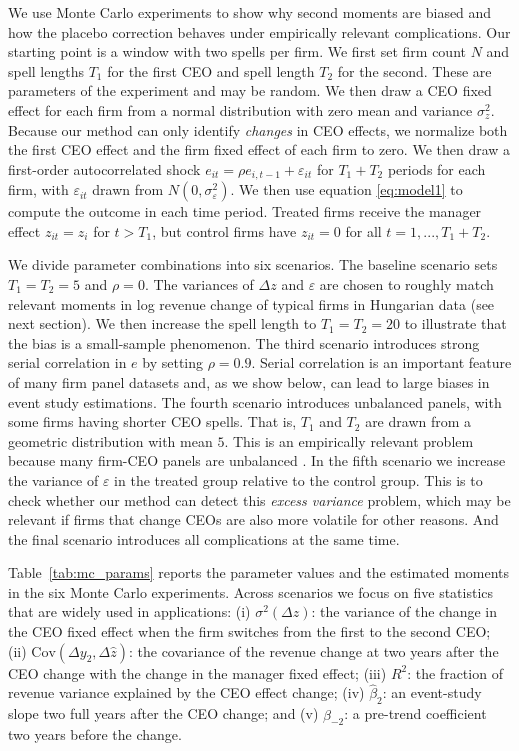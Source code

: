 \documentclass[11pt,a4paper]{article}
\begin{document}
We use Monte Carlo experiments to show why second moments are biased and how the placebo correction behaves under empirically relevant complications. Our starting point is a window with two spells per firm. We first set firm count $N$ and spell lengths $T_1$ for the first CEO and spell length $T_2$ for the second. These are parameters of the experiment and may be random. We then draw a CEO fixed effect for each firm from a normal distribution with zero mean and variance $\sigma_z^2$. Because our method can only identify \emph{changes} in CEO effects, we normalize both the first CEO effect and the firm fixed effect of each firm to zero. We then draw a first-order autocorrelated shock $e_{it} = \rho e_{i,t-1}+\varepsilon_{it}$ for $T_1+T_2$ periods for each firm, with $\varepsilon_{it}$ drawn from $N(0,\sigma^2_\varepsilon)$. We then use equation \eqref{eq:model1} to compute the outcome in each time period. Treated firms receive the manager effect $z_{it}=z_i$ for $t>T_1$, but control firms have $z_{it}=0$ for all $t=1,...,T_1+T_2$. 

We divide parameter combinations into six scenarios. The baseline scenario sets $T_1=T_2=5$ and $\rho=0$. The variances of $\Delta z$ and $\varepsilon$ are chosen to roughly match relevant moments in log revenue change of typical firms in Hungarian data (see next section). We then increase the spell length to $T_1=T_2=20$ to illustrate that the bias is a small-sample phenomenon. The third scenario introduces strong serial correlation in $e$ by setting $\rho=0.9$. Serial correlation is an important feature of many firm panel datasets \citep{Olley1996-wy,Syverson2011-ti} and, as we show below, can lead to large biases in event study estimations. The fourth scenario introduces unbalanced panels, with some firms having shorter CEO spells. That is, $T_1$ and $T_2$ are drawn from a geometric distribution with mean $5$. This is an empirically relevant problem because many firm-CEO panels are unbalanced \citep{Olley1996-wy}. In the fifth scenario we increase the variance of $\varepsilon$ in the treated group relative to the control group. This is to check whether our method can detect this \emph{excess variance} problem, which may be relevant if firms that change CEOs are also more volatile for other reasons. And the final scenario introduces all complications at the same time.

Table~\ref{tab:mc_params} reports the parameter values and the estimated moments in the six Monte Carlo experiments. Across scenarios we focus on five statistics that are widely used in applications: (i) $\sigma^2(\Delta \hat z)$: the variance of the change in the CEO fixed effect when the firm switches from the first to the second CEO; (ii) $ \mathrm{Cov}(\Delta y_2, \Delta \hat z)$: the covariance of the revenue change at two years after the CEO change with the change in the manager fixed effect; (iii) $ R^2$: the fraction of revenue variance explained by the CEO effect change; (iv) $\hat \beta_2$: an event-study slope two full years after the CEO change; and (v)  $\hat \beta_{-2}$: a pre-trend coefficient two years before the change.
\end{document}

